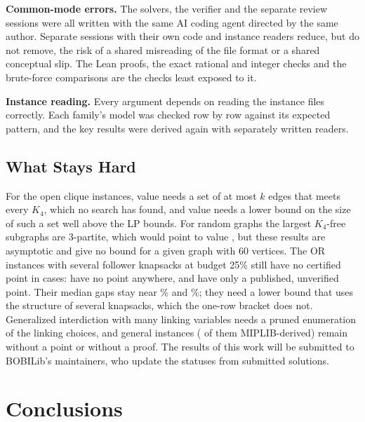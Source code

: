 \documentclass[]{spie}  %
\theoremstyle{plain}
\begin{document}
\textbf{Common-mode errors.} The solvers, the verifier and the separate review sessions were all
written with the same AI coding agent directed by the same author. Separate sessions with their own
code and instance readers reduce, but do not remove, the risk of a shared misreading of the file
format or a shared conceptual slip. The Lean proofs, the exact rational and integer checks and the
brute-force comparisons are the checks least exposed to it.

\textbf{Instance reading.} Every argument depends on reading the instance files correctly. Each
family's model was checked row by row against its expected pattern, and the key results were
derived again with separately written readers.

\subsection{What Stays Hard}

For the \NumCliqueOpen{} open clique instances, value \CliqueOpenLower{} needs a set of at most
$k$ edges that meets every $K_4$, which no search has found, and value \CliqueOpenUpper{} needs a
lower bound on the size of such a set well above the LP bounds. For random graphs the
largest $K_4$-free subgraphs are 3-partite,\cite{babai1990extremal,brightwell2012extremal} which
would point to value \CliqueOpenUpper{}, but these results are asymptotic and give no bound for a
given graph with 60 vertices. The OR instances with several follower knapsacks at budget 25\% still
have no certified point in \NumOrSeveralQuarterNoPoint{} cases: \NumOrQuarterNoPointNoPub{} have no
point anywhere, and \NumOrQuarterNoPointPub{} have only a published, unverified point. Their median
gaps stay near \OrGapZeroQuarterNow\% and \OrGapFiftyQuarterNow\%; they need a lower bound that uses
the structure of several knapsacks, which the one-row bracket does not. Generalized interdiction with
many linking variables needs a pruned enumeration of the linking choices, and
\NumGeneralUnchanged{} general instances (\NumGeneralUnchangedMiplib{} of them MIPLIB-derived)
remain without a point or without a proof. The results of this work will be submitted to BOBILib's
maintainers, who update the statuses from submitted solutions.

\section{Conclusions}\label{sec:conclusions}
\end{document}
